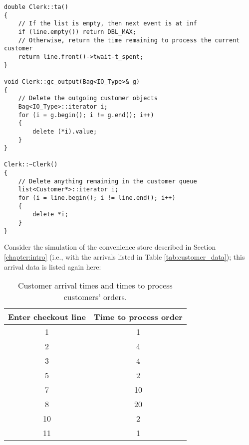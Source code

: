 \begin{verbatim}
double Clerk::ta()
{
    // If the list is empty, then next event is at inf
    if (line.empty()) return DBL_MAX;
    // Otherwise, return the time remaining to process the current customer
    return line.front()->twait-t_spent;
}

void Clerk::gc_output(Bag<IO_Type>& g)
{
    // Delete the outgoing customer objects
    Bag<IO_Type>::iterator i;
    for (i = g.begin(); i != g.end(); i++)
    {
        delete (*i).value;
    }
}

Clerk::~Clerk()
{
    // Delete anything remaining in the customer queue
    list<Customer*>::iterator i;
    for (i = line.begin(); i != line.end(); i++)
    {
        delete *i;
    }
}
\end{verbatim}

Consider the simulation of the convenience store described in Section \ref{chapter:intro} (i.e., with the arrivals listed in Table \ref{tab:customer_data}); this arrival data is listed again here: 
\begin{table}
\centering
\begin{tabular}{|c|c|}
\hline
Enter checkout line & Time to process order \\ \hline
1 & 1 \\ \hline
2 & 4 \\ \hline
3 & 4 \\ \hline
5 & 2 \\ \hline
7 & 10 \\ \hline
8 & 20 \\ \hline
10 & 2 \\ \hline
11 & 1 \\ \hline
\end{tabular}
\caption{Customer arrival times and times to process customers' orders.}
\label{tab:customer_data_again}
\end{table}

